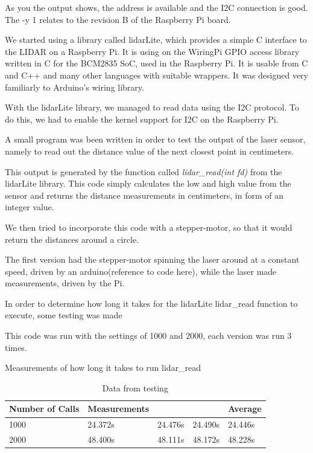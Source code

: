 As you the output shows, the address is available and the I2C connection is good. The -y 1 relates to the revision B of the Raspberry Pi board.

We started using a library called lidarLite, which provides a simple C interface to the LIDAR on a Raspberry Pi. It is using on the WiringPi GPIO access library written in C for the BCM2835 SoC, used in the Raspberry Pi. It is usable from C and C++ and many other languages with suitable wrappers. It was designed very familiarly to Arduino's wiring library.

With the lidarLite library\cite{lidarlib}, we managed to read data using the I2C protocol. To do this, we had to enable the kernel support for I2C on the Raspberry Pi\cite{i2csetup}.

A small program was been written in order to test the output of the laser sensor, namely to read out the distance value of the next closest point in centimeters. 


This output is generated by the function called \textit{lidar\_read(int fd)} from the lidarLite library. This code simply calculates the low and high value from the sensor and returns the distance measurements in centimeters, in form of an integer value.



We then tried to incorporate this code with a stepper-motor, so that it would return the distances around a circle.

The first version had the stepper-motor spinning the laser around at a constant speed, driven by an arduino(reference to code here), while the laser made measurements, driven by the Pi.

In order to determine how long it takes for the lidarLite lidar\_read function to execute, some testing was made


This code was run with the settings of 1000 and 2000, each version was run 3 times.

Measurements of how long it takes to run lidar\_read

\begin{table}[H]
	\centering
	\begin{tabular}{|l|l|l|l|l|} \hline
            Number of Calls & Measurements & & & Average \\ \hline
            1000 & 24.372s & 24.476s & 24.490s & 24.446s \\ \hline
            2000 & 48.400s & 48.111s & 48.172s & 48.228s \\ \hline
	\end{tabular}
	\caption{Data from testing}
\end{table}

